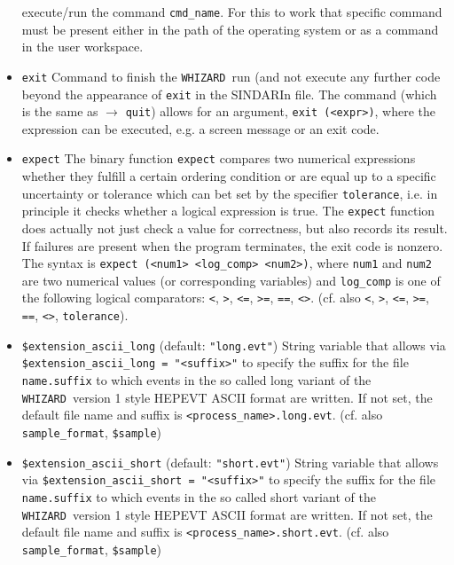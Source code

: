 \documentclass[12pt]{book}
\newcommand{\ttt}[1]{\texttt{#1}}
\newcommand{\whizard}{\texttt{WHIZARD}}
\begin{document}
\begin{itemize}
execute/run the command \ttt{cmd\_name}. For this to work that
specific command must be present either in the path of the operating
system or as a command in the user workspace. 
\item
\ttt{exit} \newline
Command to finish the \whizard\ run (and not execute any further code
beyond the appearance of \ttt{exit} in the SINDARIn file. The command
(which is the same as $\to$ \ttt{quit}) allows for an argument,
\ttt{exit (<expr>)}, where the expression can be executed, e.g. a
screen message or an exit code.
\item
\ttt{expect} \newline
The binary function \ttt{expect} compares two numerical expressions
whether they fulfill a certain ordering condition or are equal up
to a specific uncertainty or tolerance which can bet set by the
specifier \ttt{tolerance}, i.e. in principle it checks whether a
logical expression is true. The \ttt{expect} function does actually
not just check a value for correctness, but also records its result.
If failures are present when the program terminates, the exit code is
nonzero. The syntax is  \ttt{expect (<num1> <log\_comp> <num2>)},
where \ttt{num1} and \ttt{num2} are two numerical values (or
corresponding variables) and  \ttt{log\_comp} is one of the following
logical comparators: \ttt{<}, \ttt{>}, \ttt{<=},  \ttt{>=}, \ttt{==},
\ttt{<>}. 
(cf. also \ttt{<}, \ttt{>}, \ttt{<=},  \ttt{>=}, \ttt{==}, \ttt{<>},
\ttt{tolerance}).
\item
\ttt{\$extension\_ascii\_long} \qquad (default: \ttt{"long.evt"}) \newline
String variable that allows via \ttt{\$extension\_ascii\_long =
  "<suffix>"} to specify the suffix for the file \ttt{name.suffix} to
which events in the so called long variant of the \whizard\ version 1 style
HEPEVT ASCII format are written. If not set, the default file name and
suffix is \ttt{<process\_name>.long.evt}. (cf. also \ttt{sample\_format},
\ttt{\$sample})
\item
\ttt{\$extension\_ascii\_short} \qquad (default: \ttt{"short.evt"}) \newline
String variable that allows via \ttt{\$extension\_ascii\_short =
  "<suffix>"} to specify the suffix for the file \ttt{name.suffix} to
which events in the so called short variant of the \whizard\ version 1
style HEPEVT ASCII format are written. If not set, the default file
name and suffix is \ttt{<process\_name>.short.evt}. (cf. also
\ttt{sample\_format}, \ttt{\$sample})

\end{itemize}
\end{document}
